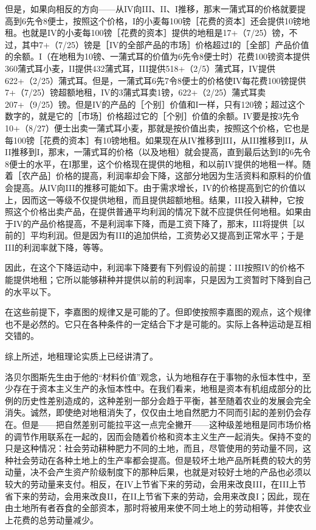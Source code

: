 但是，如果向相反的方向——从IV向III、II、I推移，那末一蒲式耳的价格就要提高到6先令8便士，按照这个价格，I的小麦每100镑［花费的资本］还会提供10镑地租。也就是IV的小麦每100镑［花费的资本］提供的地租是17+（7/25）镑，不过，其中7+（7/25）镑是［IV的全部产品的市场］价格超过I的［全部］产品价值的余额。I（在地租为10镑、一蒲式耳的价值为6先令8便士时）花费100镑资本提供360蒲式耳小麦，II提供432蒲式耳，III提供518+（2/5）蒲式耳，IV提供622+（2/25）蒲式耳。但是，一蒲式耳6先7令8便士的价格使IV每花费100镑提供7+（7/25）镑超额地租，IV的3蒲式耳卖1镑，622+（2/25）蒲式耳卖207+（9/25）镑。但是IV的产品的［个别］价值和I一样，只有120镑；超过这个数字的，就是它的［市场］价格超过它的［个别］价值的余额。IV要是按3先令10+（8/27）便士出卖一蒲式耳小麦，那就是按价值出卖，按照这个价格，它也是每100镑［花费的资本］有10镑地租。如果现在从IV推移到III，从III推移到II，从II推移到I，那末，一蒲式耳的价格（以及地租）就会提高，直到最后达到I的6先令8便士的水平，在I那里，这个价格现在提供的地租，和以前IV提供的地租一样。随着［农产品］价格的提高，利润率却会下降，这部分地因为生活资料和原料的价值会提高。从IV向III的推移可能如下。由于需求增长，IV的价格提高到它的价值以上，因而这一等级不仅提供地租，而且提供超额地租。结果，III投入耕种，它按照这个价格出卖产品，在提供普通平均利润的情况下就不应提供任何地租。如果由于IV的产品价格提高，不是利润率下降，而是工资下降了，那末，III将提供［以前的］平均利润。但是因为有III的追加供给，工资势必又提高到正常水平；于是III的利润率就下降，等等。

因此，在这个下降运动中，利润率下降要有下列假设的前提：III按照IV的价格不能提供地租；它所以能够耕种并提供以前的利润率，只是因为工资暂时下降到自己的水平以下。

在这些前提下，李嘉图的规律又是可能的了。但即使按照李嘉图的观点，这个规律也不是必然的。它只在各种条件的一定结合下才是可能的。实际上各种运动是互相交错的。


综上所述，地租理论实质上已经讲清了。

洛贝尔图斯先生由于他的“材料价值”观念，认为地租存在于事物的永恒本性中，至少存在于资本主义生产的永恒本性中。在我们看来，地租是资本有机组成部分的比例的历史性差别造成的，这种差别一部分会趋于平衡，甚至随着农业的发展会完全消失。诚然，即使绝对地租消失了，仅仅由土地自然肥力不同而引起的差别仍会存在。但是——把自然差别可能拉平这一点完全撇开——这种级差地租是同市场价格的调节作用联系在一起的，因而会随着价格和资本主义生产一起消失。保持不变的只是这种情况：社会劳动耕种肥力不同的土地，而且，尽管使用的劳动量不同，这种社会劳动在各种土地上的生产率都会提高。但是较坏土地产品所耗费的较大的劳动量，决不会产生资产阶级制度下的那种后果，也就是对较好土地的产品也必须以较大的劳动量来支付。相反，在IV上节省下来的劳动，会用来改良III，在III上节省下来的劳动，会用来改良II，在II上节省下来的劳动，会用来改良I；因此，现在由土地所有者吞食的全部资本，那时将被用来使不同土地上的劳动相等，并使农业上花费的总劳动量减少。

